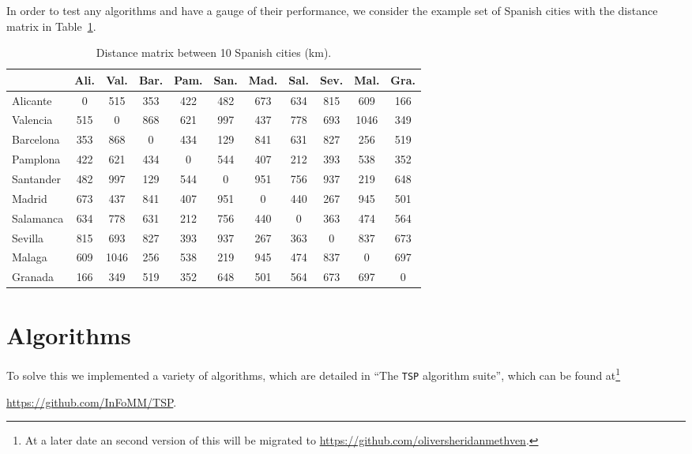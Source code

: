 \documentclass[a4paper, 11pt]{article}
\begin{document}
In order to test any algorithms and have a gauge of their performance, we consider the example set of Spanish cities with the  distance matrix in Table~\ref{tab:distance_matrix}.

\begin{table}[hbt]
\begin{center}
\begin{tabular}{|l|cccccccccc|}
\cline{2-11}
\multicolumn{1}{c|}{} & Ali.   & Val.  & Bar. & Pam. & San. & Mad. & Sal. & Sev. & Mal.  & Gra. \\
\hline 
Alicante	& 0   & 515  & 353 & 422 & 482 & 673 & 634 & 815 & 609  & 166 \\
Valencia    & 515 & 0    & 868 & 621 & 997 & 437 & 778 & 693 & 1046 & 349 \\
Barcelona	& 353 & 868  & 0   & 434 & 129 & 841 & 631 & 827 & 256  & 519 \\
Pamplona	& 422 & 621  & 434 & 0   & 544 & 407 & 212 & 393 & 538  & 352 \\
Santander	& 482 & 997  & 129 & 544 & 0   & 951 & 756 & 937 & 219  & 648 \\
Madrid		& 673 & 437  & 841 & 407 & 951 & 0   & 440 & 267 & 945  & 501 \\
Salamanca	& 634 & 778  & 631 & 212 & 756 & 440 & 0   & 363 & 474  & 564 \\
Sevilla		& 815 & 693  & 827 & 393 & 937 & 267 & 363 & 0   & 837  & 673 \\
Malaga		& 609 & 1046 & 256 & 538 & 219 & 945 & 474 & 837 & 0    & 697 \\
Granada		& 166 & 349  & 519 & 352 & 648 & 501 & 564 & 673 & 697  & 0   \\
\hline 
\end{tabular}
\caption{Distance matrix between 10 Spanish cities (km).}
\label{tab:distance_matrix}
\end{center}
\end{table}

\section{Algorithms}
\label{sec:Algorithms}

To solve this we implemented a variety of algorithms, which are detailed in ``The \texttt{TSP} algorithm suite'', which can be found at\footnote{At a later date an second version of this will be migrated to \href{https://github.com/oliversheridanmethven}{https://github.com/oliversheridanmethven}.}
\begin{center}
\href{https://github.com/InFoMM/TSP}{https://github.com/InFoMM/TSP}.
\end{center}
\end{document}
